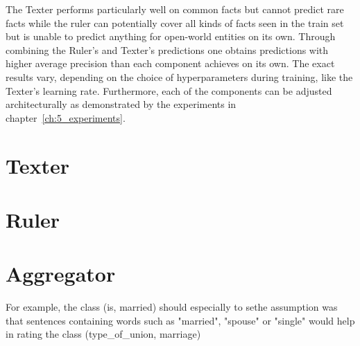 The Texter performs particularly well on common facts but cannot predict rare facts while the ruler can potentially cover all kinds of facts seen in the train set but is unable to predict anything for open-world entities on its own. Through combining the Ruler's and Texter's predictions one obtains predictions with higher average precision than each component achieves on its own. The exact results vary, depending on the choice of hyperparameters during training, like the Texter's learning rate. Furthermore, each of the components can be adjusted architecturally as demonstrated by the experiments in chapter~\ref{ch:5_experiments}.


\section{Texter}
\label{sec:4_approach/1_texter}



\section{Ruler}
\label{sec:4_approach/2_ruler}



\section{Aggregator}
\label{sec:4_approach/3_aggregator}


For example, the class (is, married) should especially to sethe assumption was that sentences containing words such as "married", "spouse" or "single" would help in rating the class (type\_of\_union, marriage)
